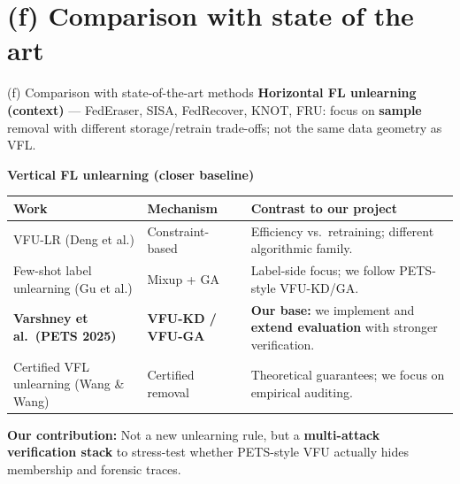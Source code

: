 \documentclass[11pt,aspectratio=169]{beamer}
\begin{document}
\section*{(f) Comparison with state of the art}
\begin{frame}{(f) Comparison with state-of-the-art methods}
  \small
  \textbf{Horizontal FL unlearning (context)} --- FedEraser, SISA, FedRecover, KNOT, FRU: focus on \textbf{sample} removal with different storage/retrain trade-offs; not the same data geometry as VFL.

  \vspace{0.35em}
  \textbf{Vertical FL unlearning (closer baseline)}
  \begin{center}
    \begin{tabular}{@{}llp{5.5cm}@{}}
      \toprule
      \textbf{Work} & \textbf{Mechanism} & \textbf{Contrast to our project} \\
      \midrule
      VFU-LR (Deng et al.) & Constraint-based & Efficiency vs.\ retraining; different algorithmic family. \\
      Few-shot label unlearning (Gu et al.) & Mixup + GA & Label-side focus; we follow PETS-style VFU-KD/GA. \\
      \textbf{Varshney et al.\ (PETS 2025)} & \textbf{VFU-KD / VFU-GA} & \textbf{Our base:} we implement and \textbf{extend evaluation} with stronger verification. \\
      Certified VFL unlearning (Wang \& Wang) & Certified removal & Theoretical guarantees; we focus on empirical auditing. \\
      \bottomrule
    \end{tabular}
  \end{center}
  \vspace{0.3em}
  \textbf{Our contribution:} Not a new unlearning rule, but a \textbf{multi-attack verification stack} to stress-test whether PETS-style VFU actually hides membership and forensic traces.
\end{frame}

\end{document}
